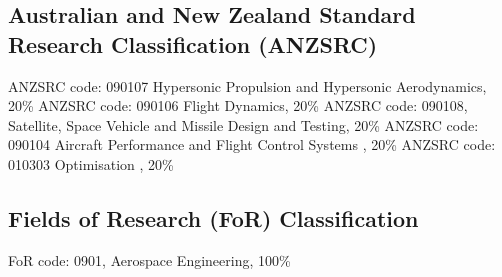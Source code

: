 \subsection*{Australian and New Zealand Standard Research Classification (ANZSRC)}

  ANZSRC code: 090107 Hypersonic Propulsion and Hypersonic Aerodynamics, 20\% \newline
 ANZSRC code: 090106 Flight Dynamics, 20\% \newline
 ANZSRC code: 090108, Satellite, Space Vehicle and Missile Design and Testing, 20\% \newline
ANZSRC code: 090104 Aircraft Performance and Flight Control Systems , 20\% \newline
ANZSRC code: 010303 Optimisation , 20\% \newline

\subsection*{Fields of Research (FoR) Classification}

  FoR code: 0901, Aerospace Engineering, 100\%

\tableofcontents

\listoffigures
{}
\listoftables
{}
\printnomenclature